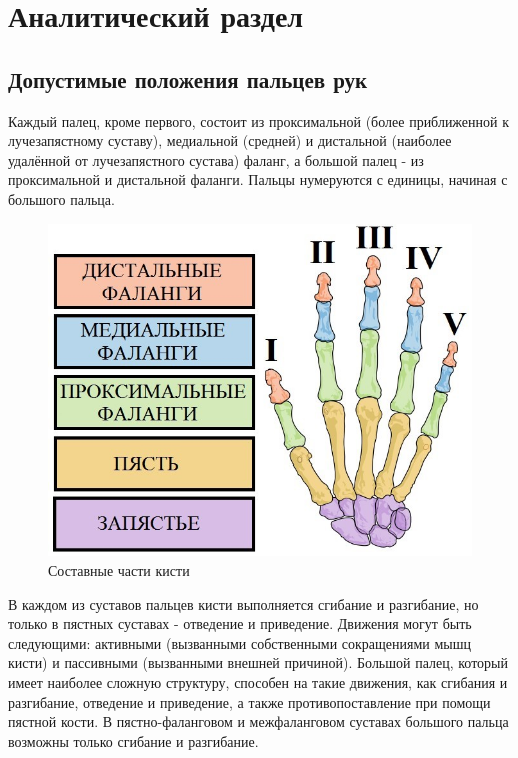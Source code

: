 \chapter{Аналитический раздел}

\section{Допустимые положения пальцев рук}
\hspace{0.6cm}Каждый палец, кроме первого, состоит из проксимальной (более приближенной к лучезапястному суставу), медиальной (средней) и дистальной (наиболее удалённой от лучезапястного сустава) фаланг, а большой палец - из проксимальной и дистальной фаланги. Пальцы нумеруются с единицы, начиная с большого пальца.  

\begin{figure}[ht!]
	\centering
	\includegraphics[scale=0.4]{hand_bones.jpg}
	\caption{Составные части кисти}
	\label{fig:hand_bones}
\end{figure}

\hspace{0.6cm}В каждом из суставов пальцев кисти выполняется сгибание и разгибание, но только в пястных суставах - отведение и приведение. Движения могут быть следующими: активными (вызванными собственными сокращениями мышц кисти) и пассивными (вызванными внешней причиной). Большой палец, который имеет наиболее сложную структуру, способен на такие движения, как сгибания и разгибание, отведение и приведение, а также противопоставление при помощи пястной кости. В пястно-фаланговом и межфаланговом суставах большого пальца возможны только сгибание и разгибание.

